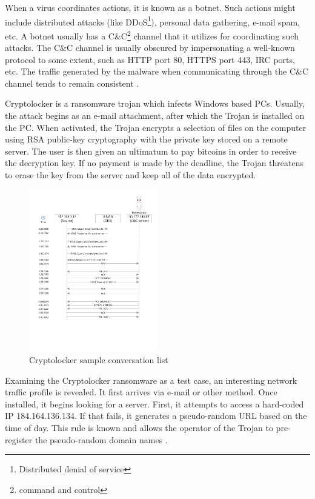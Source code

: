 \documentclass[13pt,journal,compsoc,onecolumn]{IEEEtran}
\begin{document}
When a virus coordinates actions, it is known as a botnet. Such actions might include distributed attacks (like DDoS\footnote{Distributed denial of service}), personal data gathering, e-mail spam, etc. A botnet usually has a C\&C\footnote{command and control} channel that it utilizes for coordinating such attacks.
The C\&C channel is usually obscured by impersonating a well-known protocol to some extent, such as HTTP port 80, HTTPS port 443, IRC ports, etc.
The traffic generated by the malware when communicating through the C\&C channel tends to remain consistent \cite{Vil12}.

Cryptolocker is a ransomware trojan which infects Windows based PCs. Usually, the attack begins as an e-mail attachment, after which the Trojan is installed on the PC. When activated, the Trojan encrypts a selection of files on the computer using RSA public-key cryptography with the private key stored on a remote server. The user is then given an ultimatum to pay bitcoins in order to receive the decryption key. If no payment is made by the deadline, the Trojan threatens to erase the key from the server and keep all of the data encrypted.

\begin{figure}[!ht]
 \centering
 \includegraphics[width=0.5\textwidth]{fig1.pdf}
 \caption{Cryptolocker sample conversation list\label{fig:cryptolockerconv}}
\end{figure} 

Examining the Cryptolocker ransomware as a test case, an interesting network traffic profile is revealed. It first arrives via e-mail or other method. Once installed, it begins looking for a server. First, it attempts to access a hard-coded IP 184.164.136.134. If that fails, it generates a pseudo-random URL based on the time of day. This rule is known and allows the operator of the Trojan to pre-register the pseudo-random domain names \cite{EMS13}.
\end{document}

